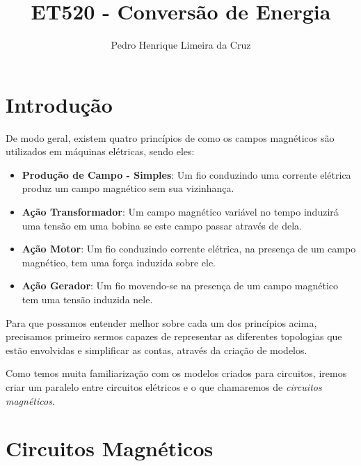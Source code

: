 \documentclass{article}
\author{Pedro Henrique Limeira da Cruz}
\title{ET520 - Conversão de Energia}
\begin{document}
\maketitle
\thispagestyle{empty}


\newpage
\tableofcontents
\newpage

\section{Introdução}
De modo geral, existem quatro princípios de como os campos magnéticos são utilizados em máquinas elétricas, sendo eles:

\begin{itemize}
    \item \textbf{Produção de Campo - Simples}: Um fio conduzindo uma corrente elétrica produz um campo magnético sem sua vizinhança.
    \item \textbf{Ação Transformador}: Um campo magnético variável no tempo induzirá uma tensão em uma bobina se este campo passar através de dela.
    \item \textbf{Ação Motor}: Um fio conduzindo corrente elétrica, na presença de um campo magnético, tem uma força induzida sobre ele.
    \item \textbf{Ação Gerador}: Um fio movendo-se na presença de um campo magnético tem uma tensão induzida nele.
\end{itemize}

Para que possamos entender melhor sobre cada um dos princípios acima, precisamos primeiro sermos capazes de representar as diferentes topologias que estão envolvidas e simplificar as contas, através da criação de modelos. 

Como temos muita familiarização com os modelos criados para circuitos, iremos criar um paralelo entre circuitos elétricos e o que chamaremos de \emph{circuitos magnéticos}.


\section{Circuitos Magnéticos}
\end{document}
